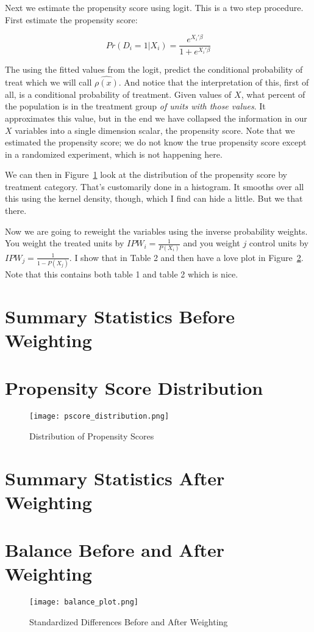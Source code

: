 \documentclass{article}
\begin{document}
Next we estimate the propensity score using logit.  This is a two step procedure.  First estimate the propensity score:

\begin{equation}
Pr(D_i = 1 | X_i) = \frac{e^{X_i'\beta}}{1 + e^{X_i'\beta}}
\end{equation}

The using the fitted values from the logit, predict the conditional probability of treat which we will call $\widehat{\rho(x)}$.  And notice that the interpretation of this, first of all, is a conditional probability of treatment.  Given values of $X$, what percent of the population is in the treatment group \emph{of units with those values}.  It approximates this value, but in the end we have collapsed the information in our $X$ variables into a single dimension scalar, the propensity score.  Note that we estimated the propensity score; we do not know the true propensity score except in a randomized experiment, which is not happening here.

We can then in Figure~\ref{fig:pscore} look at the distribution of the propensity score by treatment category.  That's customarily done in a histogram.  It smooths over all this using the kernel density, though, which I find can hide a little.  But we that there.

Now we are going to reweight the variables using the inverse probability weights.  You weight the treated units by $IPW_i = \frac{1}{P(X_i)}$ and you weight $j$ control units by $IPW_j = \frac{1}{1 - P(X_j)}$.  I show that in Table 2 and then have a love plot in Figure~\ref{fig:loveplot}.  Note that this contains both table 1 and table 2 which is nice.  


\newpage
\section{Summary Statistics Before Weighting}



\newpage
\section{Propensity Score Distribution}
\begin{figure}[H]
    \centering
    \texttt{[image: pscore\_distribution.png]}
    \caption{Distribution of Propensity Scores}
    \label{fig:pscore}
\end{figure}

\newpage
\section{Summary Statistics After Weighting}


\newpage
\section{Balance Before and After Weighting}
\begin{figure}[H]
    \centering
    \texttt{[image: balance\_plot.png]}
    \caption{Standardized Differences Before and After Weighting}
    \label{fig:loveplot}
\end{figure}
\end{document}
